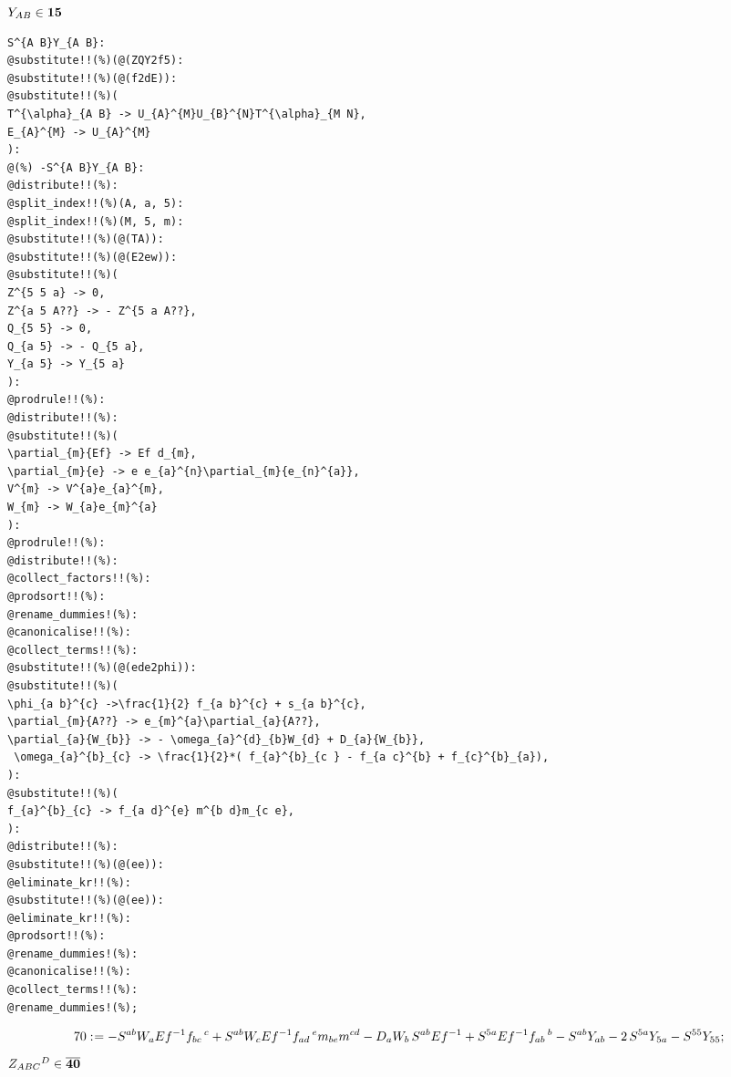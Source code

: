 \documentclass[11pt]{article}
\def\specialcolon{\mathrel{\mathop{:}}\hspace{-.5em}}
\begin{document}
$Y_{AB} \in \bf 15$
{\color[named]{Blue}\begin{verbatim}
S^{A B}Y_{A B}:
@substitute!!(%)(@(ZQY2f5):
@substitute!!(%)(@(f2dE)):
@substitute!!(%)(
T^{\alpha}_{A B} -> U_{A}^{M}U_{B}^{N}T^{\alpha}_{M N},
E_{A}^{M} -> U_{A}^{M}
):
@(%) -S^{A B}Y_{A B}:
@distribute!!(%):
@split_index!!(%)(A, a, 5):
@split_index!!(%)(M, 5, m):
@substitute!!(%)(@(TA)):
@substitute!!(%)(@(E2ew)):
@substitute!!(%)(
Z^{5 5 a} -> 0,
Z^{a 5 A??} -> - Z^{5 a A??},
Q_{5 5} -> 0,
Q_{a 5} -> - Q_{5 a},
Y_{a 5} -> Y_{5 a}
):
@prodrule!!(%):
@distribute!!(%):
@substitute!!(%)(
\partial_{m}{Ef} -> Ef d_{m},
\partial_{m}{e} -> e e_{a}^{n}\partial_{m}{e_{n}^{a}},
V^{m} -> V^{a}e_{a}^{m},
W_{m} -> W_{a}e_{m}^{a}
):
@prodrule!!(%):
@distribute!!(%):
@collect_factors!!(%):
@prodsort!!(%):
@rename_dummies!(%):
@canonicalise!!(%):
@collect_terms!!(%):
@substitute!!(%)(@(ede2phi)):
@substitute!!(%)(
\phi_{a b}^{c} ->\frac{1}{2} f_{a b}^{c} + s_{a b}^{c},
\partial_{m}{A??} -> e_{m}^{a}\partial_{a}{A??},
\partial_{a}{W_{b}} -> - \omega_{a}^{d}_{b}W_{d} + D_{a}{W_{b}},
 \omega_{a}^{b}_{c} -> \frac{1}{2}*( f_{a}^{b}_{c } - f_{a c}^{b} + f_{c}^{b}_{a}),
):
@substitute!!(%)(
f_{a}^{b}_{c} -> f_{a d}^{e} m^{b d}m_{c e},
):
@distribute!!(%):
@substitute!!(%)(@(ee)):
@eliminate_kr!!(%):
@substitute!!(%)(@(ee)):
@eliminate_kr!!(%):
@prodsort!!(%):
@rename_dummies!(%):
@canonicalise!!(%):
@collect_terms!!(%):
@rename_dummies!(%);
\end{verbatim}}
\begin{dmath*}[compact, spread=2pt]
70\specialcolon{}=  - {S}^{a b} {W}_{a} Ef{}^{-1} {f}_{b c}\,^{c} + {S}^{a b} {W}_{c} Ef{}^{-1} {f}_{a d}\,^{e} {m}_{b e} {m}^{c d} - {D}_{a}{{W}_{b}}\,  {S}^{a b} Ef{}^{-1} + {S}^{5 a} Ef{}^{-1} {f}_{a b}\,^{b} - {S}^{a b} {Y}_{a b} - 2\, {S}^{5 a} {Y}_{5 a} - {S}^{5 5} {Y}_{5 5};
\end{dmath*}
$Z_{A B C}{}^D \in \bf \overline{40}$
\end{document}
